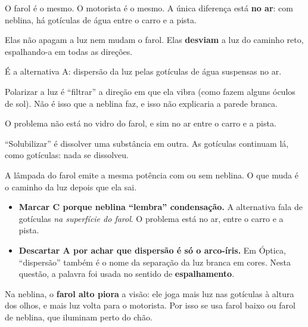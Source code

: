 \passoapasso
{}
O farol é o mesmo. O motorista é o mesmo. A única diferença está \textbf{no ar}: com neblina, há gotículas de água entre o
carro e a pista.

Elas não apagam a luz nem mudam o farol. Elas \textbf{desviam} a luz do caminho reto, espalhando-a em todas as direções.

É a alternativa A: dispersão da luz pelas gotículas de água suspensas no ar.


\begin{outras}
 Polarizar a luz é ``filtrar'' a direção em que ela vibra (como fazem alguns óculos de sol). Não é isso que a neblina faz, e isso não explicaria a parede branca.\par
{} O problema não está no vidro do farol, e sim no ar entre o carro e a pista.\par
{} ``Solubilizar'' é dissolver uma substância em outra. As gotículas continuam lá, como gotículas: nada se dissolveu.\par
{} A lâmpada do farol emite a mesma potência com ou sem neblina. O que muda é o caminho da luz depois que ela sai.
\end{outras}

\begin{pegadinha}
\begin{itemize}
  \item \textbf{Marcar C porque neblina ``lembra'' condensação.} A alternativa fala de gotículas \emph{na superfície do farol}.
        O problema está no ar, entre o carro e a pista.
  \item \textbf{Descartar A por achar que dispersão é só o arco-íris.} Em Óptica, ``dispersão'' também é o nome da separação da
        luz branca em cores. Nesta questão, a palavra foi usada no sentido de \textbf{espalhamento}.
\end{itemize}
\end{pegadinha}

\begin{guardar}
Na neblina, o \textbf{farol alto piora} a visão: ele joga mais luz nas gotículas à altura dos olhos, e mais luz volta para o
motorista. Por isso se usa farol baixo ou farol de neblina, que iluminam perto do chão.
\end{guardar}
